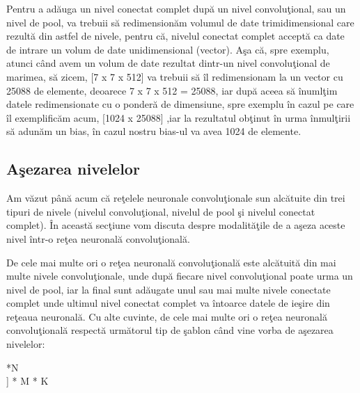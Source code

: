 Pentru a ad\u{a}uga un nivel conectat complet dup\u{a} un nivel convolu\c{t}ional, sau un nivel de pool, va trebuii s\u{a} redimension\u{a}m volumul de date trimidimensional care rezult\u{a} din astfel de nivele, pentru c\u{a}, nivelul conectat complet accept\u{a} ca date de intrare un volum de date unidimensional (vector). A\c{s}a c\u{a}, spre exemplu, atunci c\^{a}nd avem un volum de date rezultat dintr-un nivel convolu\c{t}ional de marimea, s\u{a} zicem, [7 x 7 x 512] va trebuii s\u{a} \^{i}l redimensionam la un vector cu 25088 de elemente, deoarece 7 x 7 x 512 = 25088, iar dup\u{a} aceea s\u{a} \^{i}numl\c{t}im datele redimensionate cu o ponder\u{a} de dimensiune, spre exemplu \^{i}n cazul pe care \^{i}l exemplific\u{a}m acum, [1024 x 25088] ,iar la rezultatul ob\c{t}inut \^{i}n urma \^{i}nmul\c{t}irii s\u{a} adun\u{a}m un bias, \^{i}n cazul nostru bias-ul  va avea 1024 de elemente.

\subsection{A\c{s}ezarea nivelelor}

Am v\u{a}zut p\^{a}n\u{a} acum c\u{a} re\c{t}elele neuronale convolu\c{t}ionale sun alc\u{a}tuite din trei tipuri de nivele (nivelul convolu\c{t}ional, nivelul de pool \c{s}i nivelul conectat complet). \^{I}n aceast\u{a} sec\c{t}iune vom discuta despre modalit\u{a}\c{t}ile de a a\c{s}eza aceste nivel \^{i}ntr-o re\c{t}ea neuronal\u{a} convolu\c{t}ional\u{a}.

\par

De cele mai multe ori o re\c{t}ea neuronal\u{a} convolu\c{t}ional\u{a} este alc\u{a}tuit\u{a} din mai multe nivele convolu\c{t}ionale, unde dup\u{a} fiecare nivel convolu\c{t}ional poate urma un nivel de pool, iar la final sunt ad\u{a}ugate unul sau mai multe nivele conectate complet unde ultimul nivel conectat complet va \^{i}ntoarce datele de ie\c{s}ire din re\c{t}eaua neuronal\u{a}. Cu alte cuvinte, de cele mai multe ori o re\c{t}ea neuronal\u{a} convolu\c{t}ional\u{a} respect\u{a} urm\u{a}torul tip de \c{s}ablon c\^{a}nd vine vorba de a\c{s}ezarea nivelelor:

\par

 \longrightarrow [[\text{Nivel convolu\c{t}ional} \longrightarrow \text{ReLU}]*N \longrightarrow \\
\longrightarrow {} ] * M  * K  \longrightarrow \\
\longrightarrow {} \longrightarrow {}

